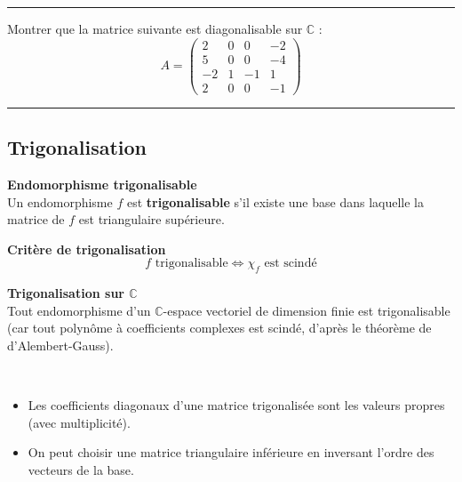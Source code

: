 \documentclass[../PolyS4.tex]{subfiles}
\begin{document}
\vspace{1em}
\hrule
\vspace{1em}


Montrer que la matrice suivante est diagonalisable sur $\mathbb{C}$ :
$$A = \begin{pmatrix}
2 & 0 & 0 & -2 \\
5 & 0 & 0 & -4 \\
-2 & 1 & -1 & 1 \\
2 & 0 & 0 & -1
\end{pmatrix}$$

\vspace{1em}
\hrule
\vspace{1em}

\subsection{Trigonalisation}

\begin{Def}\textbf{Endomorphisme trigonalisable}\\

Un endomorphisme $f$ est \textbf{trigonalisable} s'il existe une base dans laquelle la matrice de $f$ est triangulaire supérieure.
\end{Def}

\begin{Thm}\textbf{Critère de trigonalisation}\\

$$f \text{ trigonalisable} \Longleftrightarrow \chi_f \text{ est scindé}$$
\end{Thm}

\begin{Thm}\textbf{Trigonalisation sur $\mathbb{C}$}\\

Tout endomorphisme d'un $\mathbb{C}$-espace vectoriel de dimension finie est trigonalisable (car tout polynôme à coefficients complexes est scindé, d'après le théorème de d'Alembert-Gauss).
\end{Thm}

\begin{Rmq}$\,$

\begin{itemize}
    \item Les coefficients diagonaux d'une matrice trigonalisée sont les valeurs propres (avec multiplicité).
    \item On peut choisir une matrice triangulaire inférieure en inversant l'ordre des vecteurs de la base.
\end{itemize}
\end{Rmq}
\end{document}
